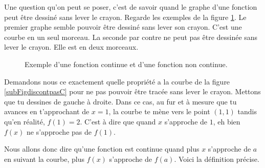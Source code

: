 \documentclass[a4paper,12pt]{book}
\theoremstyle{mes_exemples}	\newtheorem{exemple}[numtho]{Exemple}
\theoremstyle{mes_tho}
\begin{document}
Une question qu'on peut se poser, c'est de savoir quand le graphe d'une fonction peut être dessiné sans lever le crayon. Regarde les exemples de la figure \ref{FigUncontDeuxpasC}. Le premier graphe semble pouvoir être dessiné sans lever son crayon. C'est une courbe en un seul morceau. La seconde par contre ne peut pas être dessinée sans lever le crayon. Elle est en deux morceaux.
\begin{figure}[ht] 
\centering
{}
%
%
\caption{Exemple d'une fonction continue et d'une fonction non continue.}\label{FigUncontDeuxpasC}
\end{figure}

Demandons nous ce exactement quelle propriété a la courbe de la figure \ref{subFigdiscontpasC} pour ne pas pouvoir être tracée sans lever le crayon. Mettons que tu dessines de gauche à droite. Dans ce cas, au fur et à mesure que tu avances en t'approchant de $x=1$, la courbe te mène vers le point $(1,1)$ tandis qu'en réalité, $f(1)=2$. C'est à dire que quand $x$ s'approche de $1$, eh bien $f(x)$ ne s'approche pas de $f(1)$.

Nous allons donc dire qu'une fonction est continue quand plus $x$ s'approche de $a$ en suivant la courbe, plus $f(x)$ s'approche de $f(a)$. Voici la définition précise.
\end{document}
